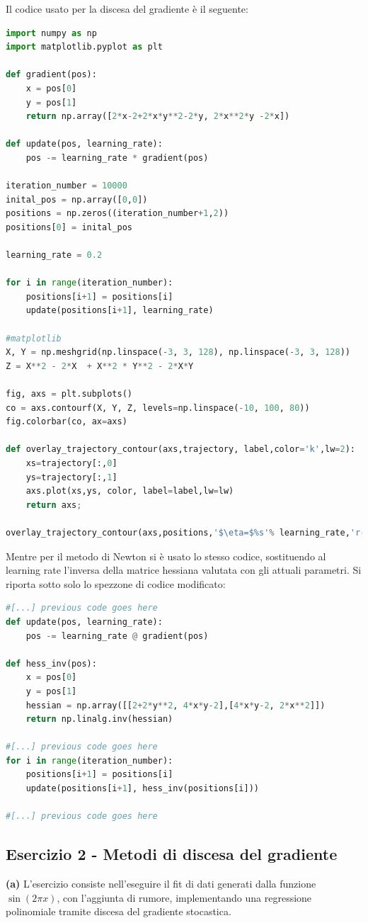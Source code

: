 \documentclass{article}
\begin{document}
Il codice usato per la discesa del gradiente è il seguente:

\begin{lstlisting}[language = Python]
import numpy as np
import matplotlib.pyplot as plt

def gradient(pos):
    x = pos[0]
    y = pos[1]
    return np.array([2*x-2+2*x*y**2-2*y, 2*x**2*y -2*x])

def update(pos, learning_rate):
    pos -= learning_rate * gradient(pos)

iteration_number = 10000
inital_pos = np.array([0,0])
positions = np.zeros((iteration_number+1,2))
positions[0] = inital_pos

learning_rate = 0.2

for i in range(iteration_number):
    positions[i+1] = positions[i]
    update(positions[i+1], learning_rate)

#matplotlib
X, Y = np.meshgrid(np.linspace(-3, 3, 128), np.linspace(-3, 3, 128))
Z = X**2 - 2*X  + X**2 * Y**2 - 2*X*Y

fig, axs = plt.subplots()
co = axs.contourf(X, Y, Z, levels=np.linspace(-10, 100, 80))
fig.colorbar(co, ax=axs)

def overlay_trajectory_contour(axs,trajectory, label,color='k',lw=2):
    xs=trajectory[:,0]
    ys=trajectory[:,1]
    axs.plot(xs,ys, color, label=label,lw=lw)
    return axs;

overlay_trajectory_contour(axs,positions,'$\eta=$%s'% learning_rate,'r--*', lw=0.5)
\end{lstlisting}
Mentre per il metodo di Newton si è usato lo stesso codice, sostituendo al learning rate l'inversa della matrice hessiana valutata con gli attuali parametri. Si riporta sotto solo lo spezzone di codice modificato:

\begin{lstlisting}[language = Python]
#[...] previous code goes here
def update(pos, learning_rate):
    pos -= learning_rate @ gradient(pos)

def hess_inv(pos):
    x = pos[0]
    y = pos[1]
    hessian = np.array([[2+2*y**2, 4*x*y-2],[4*x*y-2, 2*x**2]])
    return np.linalg.inv(hessian)

#[...] previous code goes here
for i in range(iteration_number):
    positions[i+1] = positions[i]
    update(positions[i+1], hess_inv(positions[i]))

#[...] previous code goes here
\end{lstlisting}

\subsection* {Esercizio 2 - Metodi di discesa del gradiente}
\textbf{(a)} 
L'esercizio consiste nell'eseguire il fit di dati generati dalla funzione $\sin(2\pi x)$, con l'aggiunta di rumore, implementando una regressione polinomiale tramite discesa del gradiente stocastica.
\end{document}
